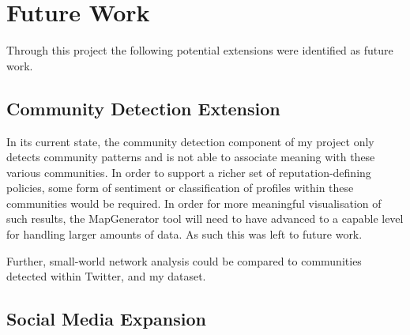 




\section{Future Work}

Through this project the following potential extensions were identified as future work.

\subsection{Community Detection Extension}

In its current state, the community detection component of my project only detects community patterns and is not able to associate meaning with these various communities. In order to support a richer set of reputation-defining policies, some form of sentiment or classification of profiles within these communities would be required. In order for more meaningful visualisation of such results, the MapGenerator tool will need to have advanced to a capable level for handling larger amounts of data. As such this was left to future work.

Further, small-world network analysis could be compared to communities detected within Twitter, and my dataset. 

\subsection{Social Media Expansion}

